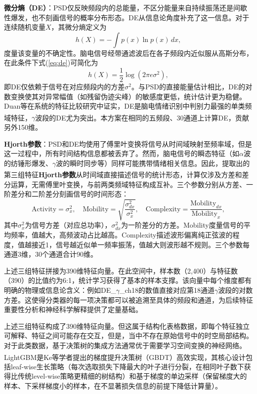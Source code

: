 \documentclass[UTF8,zihao=-4,fontset=windows]{ctexart}
\let\oldcite\cite
\renewcommand{\cite}[1]{\textsuperscript{\oldcite{#1}}}
\numberwithin{equation}{section}
\numberwithin{figure}{section}
\numberwithin{table}{section}
\begin{document}
\textbf{微分熵（DE）}：PSD仅反映频段内的总能量，不区分能量来自持续振荡还是间歇性爆发，也不刻画信号的概率分布形态。DE从信息论角度补充了这一信息。对于连续随机变量$X$，其微分熵定义为
\begin{equation}
h(X) = -\int p(x)\ln p(x)\,dx,
\label{eq:de}
\end{equation}
度量该变量的不确定性。脑电信号经带通滤波后在各子频段内近似服从高斯分布，在此条件下式(\ref{eq:de})可简化为
\begin{equation}
h(X) = \frac{1}{2}\log(2\pi e\sigma^2),
\label{eq:de_gauss}
\end{equation}
即DE仅依赖于信号在对应频段内的方差$\sigma^2$。与PSD的直接能量估计相比，DE的对数变换使其对异常幅值（如残留伪迹尖峰）的敏感度更低，统计估计更为稳健。Duan等在系统的特征比较研究中证实，DE是脑电情绪识别中判别力最强的单类频域特征，$\gamma$波段的DE尤为突出\cite{duan_de}。本方案在相同的五频段、30通道上计算DE，贡献另外150维。

\textbf{Hjorth参数}：PSD和DE均使用了傅里叶变换将信号从时间域映射至频率域，但是这一过程中，所有时间结构信息都被丢弃了。然而，脑电信号的瞬态特征（如$\alpha$波的纺锤形爆发、$\gamma$波的瞬时同步等）同样可能携带情绪相关信息。因此，提取出的第三组特征\textbf{Hjorth参数}\cite{hjorth}从时间域直接描述信号的统计形态，计算仅涉及方差和差分运算，无需傅里叶变换，与前两类频域特征构成互补。三个参数分别从方差、一阶差分和二阶差分刻画信号的时间形态：
\begin{equation}
\text{Activity} = \sigma_x^2,\quad
\text{Mobility} = \sqrt{\frac{\sigma_{dx}^2}{\sigma_x^2}},\quad
\text{Complexity} = \frac{\text{Mobility}_{dx}}{\text{Mobility}_x},
\label{eq:hjorth}
\end{equation}
其中$\sigma_x^2$为信号方差（对应总功率），$\sigma_{dx}^2$为一阶差分的方差。Mobility度量信号的平均频率，值越大，高频波动占比越高。Complexity描述波形偏离纯正弦波的程度，值越接近1，信号越近似单一频率振荡，值越大则波形越不规则。三个参数每通道3维，30个通道合计90维。

上述三组特征拼接为390维特征向量。在此空间中，样本数（2,400）与特征数（390）的比值约为6:1，统计学习获得了基本的样本支撑。该向量中每个维度都有明确的物理或信息论含义：例如DE\_$\gamma$\_ch18的数值直接对应第18通道$\gamma$波段的对数方差。这使得分类器的每一项决策都可以被追溯至具体的频段和通道，为后续特征重要性分析和神经科学解释提供了定量基础。

上述三组特征构成了390维特征向量。但这属于结构化表格数据，即每个特征独立可解释、特征之间可能存在交互，但是，当中不存在原始信号中的时空局部结构。对于此类数据，基于决策树的集成方法通常优于需要学习空间变换的神经网络。LightGBM是Ke等学者提出的梯度提升决策树（GBDT）高效实现\cite{lightgbm}，其核心设计包括leaf-wise生长策略（每次选取损失下降最大的叶子进行分裂，在相同叶子数下获得比传统level-wise策略更精细的树结构）和基于梯度的单边采样（保留梯度大的样本、下采样梯度小的样本，在不显著损失信息的前提下降低计算量）。
\end{document}
